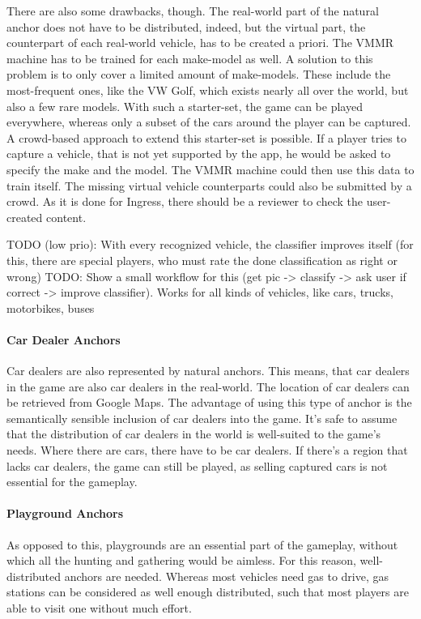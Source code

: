 There are also some drawbacks, though. The real-world part of the natural anchor does not have to be distributed, indeed, but the virtual part, the counterpart of each real-world vehicle, has to be created a priori. The VMMR machine has to be trained for each make-model as well. A solution to this problem is to only cover a limited amount of make-models. These include the most-frequent ones, like the VW Golf, which exists nearly all over the world, but also a few rare models. With such a starter-set, the game can be played everywhere, whereas only a subset of the cars around the player can be captured. A crowd-based approach to extend this starter-set is possible. If a player tries to capture a vehicle, that is not yet supported by the app, he would be asked to specify the make and the model. The VMMR machine could then use this data to train itself. The missing virtual vehicle counterparts could also be submitted by a crowd. As it is done for Ingress, there should be a reviewer to check the user-created content.

TODO (low prio):
With every recognized vehicle, the classifier improves itself (for this, there are special players, who must rate the done classification as right or wrong)
TODO: Show a small workflow for this (get pic -> classify -> ask user if correct -> improve classifier).
Works for all kinds of vehicles, like cars, trucks, motorbikes, buses

\paragraph{Car Dealer Anchors}
Car dealers are also represented by natural anchors. This means, that car dealers in the game are also car dealers in the real-world. The location of car dealers can be retrieved from Google Maps. The advantage of using this type of anchor is the semantically sensible inclusion of car dealers into the game. It's safe to assume that the distribution of car dealers in the world is well-suited to the game's needs. Where there are cars, there have to be car dealers. If there's a region that lacks car dealers, the game can still be played, as selling captured cars is not essential for the gameplay.

\paragraph{Playground Anchors}
As opposed to this, playgrounds are an essential part of the gameplay, without which all the hunting and gathering would be aimless. For this reason, well-distributed anchors are needed. Whereas most vehicles need gas to drive, gas stations can be considered as well enough distributed, such that most players are able to visit one without much effort.


